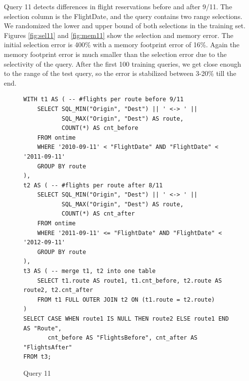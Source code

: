 Query 11 detects differences in flight reservations before and after 9/11.
The selection column is the FlightDate, and the query contains two range
selections. We randomized the lower and upper bound of both selections in the
training set. Figures \ref{fig:sel11} and \ref{fig:mem11} show the selection and memory error.
The initial selection error is 400\% with a memory footprint error
of 16\%. Again the memory footprint error is much smaller than the selection error
due to the selectivity of the query. After the first 100 training queries,
we get close enough to the range of the test query,
so the error is stabilized between 3-20\% till the end.

\begin{figure}[htb!]
\begin{lstlisting}[frame=single]
WITH t1 AS ( -- #flights per route before 9/11
    SELECT SQL_MIN("Origin", "Dest") || ' <-> ' ||
           SQL_MAX("Origin", "Dest") AS route,
           COUNT(*) AS cnt_before
    FROM ontime
    WHERE '2010-09-11' < "FlightDate" AND "FlightDate" < '2011-09-11'
    GROUP BY route
),
t2 AS ( -- #flights per route after 8/11
    SELECT SQL_MIN("Origin", "Dest") || ' <-> ' ||
           SQL_MAX("Origin", "Dest") AS route,
           COUNT(*) AS cnt_after
    FROM ontime
    WHERE '2011-09-11' <= "FlightDate" AND "FlightDate" < '2012-09-11'
    GROUP BY route
),
t3 AS ( -- merge t1, t2 into one table
    SELECT t1.route AS route1, t1.cnt_before, t2.route AS route2, t2.cnt_after
    FROM t1 FULL OUTER JOIN t2 ON (t1.route = t2.route)
)
SELECT CASE WHEN route1 IS NULL THEN route2 ELSE route1 END AS "Route",
       cnt_before AS "FlightsBefore", cnt_after AS "FlightsAfter"
FROM t3;
\end{lstlisting}
  \caption{Query 11}
  \label{sel:sql11}
\end{figure}

